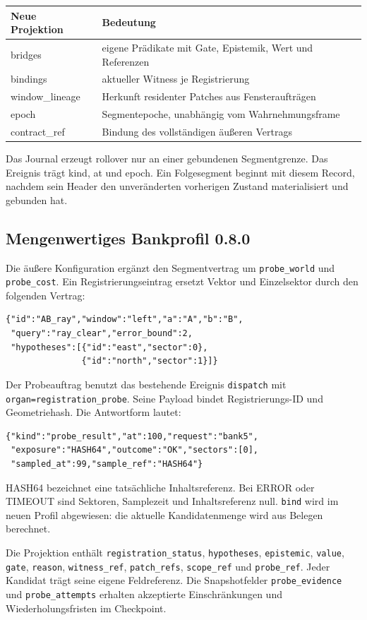\documentclass[11pt,a4paper]{article}
\begin{document}
\begin{tabularx}{\linewidth}{@{}lY@{}}\toprule
Neue Projektion & Bedeutung\\\midrule
bridges & eigene Prädikate mit Gate, Epistemik, Wert und Referenzen\\
bindings & aktueller Witness je Registrierung\\
window\_lineage & Herkunft residenter Patches aus Fensteraufträgen\\
epoch & Segmentepoche, unabhängig vom Wahrnehmungsframe\\
contract\_ref & Bindung des vollständigen äußeren Vertrags\\\bottomrule
\end{tabularx}

Das Journal erzeugt rollover nur an einer gebundenen Segmentgrenze.
Das Ereignis trägt kind, at und epoch. Ein Folgesegment beginnt
mit diesem Record, nachdem sein Header den unveränderten
vorherigen Zustand materialisiert und gebunden hat.

\clearpage\subsection{Mengenwertiges Bankprofil 0.8.0}
Die äußere Konfiguration ergänzt den Segmentvertrag um
\texttt{probe\_world} und \texttt{probe\_cost}. Ein Registrierungseintrag
ersetzt Vektor und Einzelsektor durch den folgenden Vertrag:
\begin{lstlisting}
{"id":"AB_ray","window":"left","a":"A","b":"B",
 "query":"ray_clear","error_bound":2,
 "hypotheses":[{"id":"east","sector":0},
               {"id":"north","sector":1}]}
\end{lstlisting}
Der Probeauftrag benutzt das bestehende Ereignis \texttt{dispatch}
mit \texttt{organ=registration\_probe}. Seine Payload bindet
Registrierungs-ID und Geometriehash. Die Antwortform lautet:
\begin{lstlisting}
{"kind":"probe_result","at":100,"request":"bank5",
 "exposure":"HASH64","outcome":"OK","sectors":[0],
 "sampled_at":99,"sample_ref":"HASH64"}
\end{lstlisting}
HASH64 bezeichnet eine tatsächliche Inhaltsreferenz. Bei ERROR oder
TIMEOUT sind Sektoren, Samplezeit und Inhaltsreferenz null.
\texttt{bind} wird im neuen Profil abgewiesen: die aktuelle
Kandidatenmenge wird aus Belegen berechnet.

Die Projektion enthält \texttt{registration\_status},
\texttt{hypotheses}, \texttt{epistemic}, \texttt{value},
\texttt{gate}, \texttt{reason}, \texttt{witness\_ref},
\texttt{patch\_refs}, \texttt{scope\_ref} und \texttt{probe\_ref}.
Jeder Kandidat trägt seine eigene Feldreferenz. Die Snapshotfelder
\texttt{probe\_evidence} und \texttt{probe\_attempts} erhalten
akzeptierte Einschränkungen und Wiederholungsfristen im Checkpoint.
\end{document}
